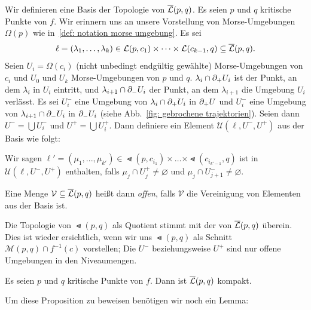 \begin{definition}
    \label{def: topologie gebrochener trajektorien}
    Wir definieren eine Basis der Topologie von ${\overline{\mathcal{L}} } (p, q)$. Es seien $p$ und $q$ kritische 
    Punkte von $f$. Wir erinnern uns an unsere Vorstellung von Morse-Umgebungen $\Omega(p)$ wie 
    in~\ref{def: notation morse umgebung}.
    Es sei
    \[ \ell = (\lambda_1, \dots, \lambda_k) 
        \in { \mathcal{L} } (p, c_1) \times \dots \times { \mathcal{L} }(c_{k - 1}, q) \subseteq {\overline{\mathcal{L}} } (p, q) . \]
    Seien $U_i = \Omega(c_i)$ (nicht unbedingt endgültig gewählte) Morse-Umgebungen von $c_i$ 
    und $U_0$ und $U_k$ Morse-Umgebungen von $p$ und $q$. $\lambda_i \cap { \partial }_+ U_i$ ist der 
    Punkt, an dem $\lambda_i$ in $U_i$ eintritt, und $\lambda_{i + 1} \cap { \partial }_- U_i$ der 
    Punkt, an dem $\lambda_{i + 1}$ die Umgebung $U_i$ verlässt. Es sei $U_i^-$ eine Umgebung von 
    $\lambda_i \cap { \partial }_+ U_i$ in 
    ${ \partial }_+ U$ und $U_i^-$ eine Umgebung von $\lambda_{i + 1} \cap { \partial }_- U_i$ in ${ \partial }_- U_i$
    (siehe Abb.~\ref{fig: gebrochene trajektorien}). 
    Seien dann $U^- = \bigcup U_i^-$ und $U^+ = \bigcup U_i^+$. Dann definiere ein Element
    $\mathcal{U} (\ell, U^-, U^+)$ aus der Basis wie folgt:

    Wir sagen 
    $\ell' = (\mu_1, ..., \mu_{k'}) \in \Lt (p, c_{i_1}) \times \dots \times \Lt (c_{i_{k'-1}}, q)$
    ist in $\mathcal{U}(\ell, U^-, U^+)$ enthalten, falls $\mu_j \cap U_j^+ \neq \varnothing$
    und $\mu_j \cap U_{j + 1}^- \neq \varnothing$. 

    Eine Menge $\mathcal{V} \subseteq {\overline{\mathcal{L}} } (p, q)$ heißt dann \textit{offen}, falls $\mathcal{V}$
    die Vereinigung von Elementen aus der Basis ist.
\end{definition}

\begin{remark}
    Die Topologie von $\Lt(p, q)$ als Quotient stimmt mit der von ${\overline{\mathcal{L}} }(p, q)$ überein.
    Dies ist wieder ersichtlich, wenn wir uns $\Lt (p, q)$ als Schnitt 
    $\mathcal{M} (p, q) \cap f^{-1}(c)$ vorstellen; Die $U^-$ beziehungsweise $U^+$ sind nur 
    offene Umgebungen in den Niveaumengen.
\end{remark}

\begin{prop}
    \label{prop: Lb ist kompakt}
    Es seien $p$ und $q$ kritische Punkte von $f$. Dann ist ${\overline{\mathcal{L}} } (p, q)$ kompakt.
\end{prop}

Um diese Proposition zu beweisen benötigen wir noch ein Lemma:

